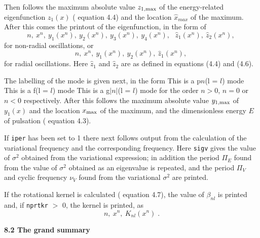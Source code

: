 Then follows the maximum absolute value $z_{1,\rm max}$ 
of the energy-related eigenfunction $z_1 (x)$ 
({\cf} equation 4.4) and the location $\hat x_{max}$ of the maximum. 
After this comes 
the printout of the eigenfunction, in the form of
$$
n, \  x^n , \  
y_1 ( x^n ) , \ 
y_2 ( x^n ) , \ 
y_3 ( x^n ) , \ 
y_4 ( x^n ) , \ \ \ 
\hat z_1 ( x^n ) , \ 
\hat z_2 ( x^n ) , \ 
$$
for non-radial oscillations, or
$$
n, \  x^n , \  
y_1 ( x^n ) , \ 
y_2 ( x^n ) , \ 
\hat z_1 ( x^n ) , \ 
$$
for radial oscillations. Here $\hat z_1$ and $\hat z_2$
are as defined in equations (4.4) and (4.6).

The labelling of the mode is given next, in the form 
\ms
{\source
This is a p$n$(l = $l$) mode
This is a f(l = $l$) mode
This is a g$|n|$(l = $l$) mode
}
\msni
for the order $n > 0$, $n = 0$ or $n < 0$ respectively.
After this follows the maximum absolute value $y_{1,\rm max}$ of
$y_1 (x)$ and the location $x_{\rm max}$ of the maximum, and the
dimensionless energy $E$ of pulsation ({\cf} equation 4.3).

If {\tt iper} has been set to 1 there next follows output from the
calculation of the variational frequency and the corresponding
frequency. Here {\tt sigv} gives the value of $\sigma^2$ obtained
from the variational expression; in addition the period $\Pi_E$ found
from the value of $\sigma^2$ obtained as an eigenvalue is repeated,
and the period $\Pi_V$ and cyclic frequency $\nu_V$ 
found from the variational $\sigma^2$ are printed.

If the rotational kernel is calculated 
({\cf} equation 4.7), the value of $\beta_{nl}$ is printed and, if
{\tt nprtkr} $>$ 0, the kernel is printed, as
$$
n , \  x^n , \  K_{nl} ( x^n ) \; .
$$

\subsect
{\bf 8.2 The grand summary} 

